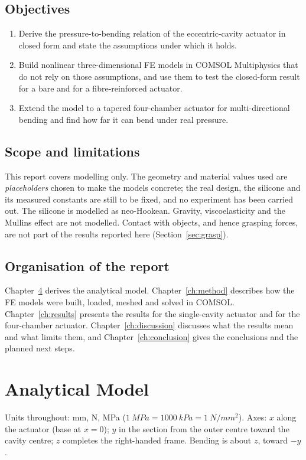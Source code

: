 \documentclass[12pt,a4paper,oneside]{report}
\numberwithin{equation}{chapter}
\numberwithin{figure}{chapter}
\numberwithin{table}{chapter}
\begin{document}
\section{Objectives}
\begin{enumerate}
\item Derive the pressure-to-bending relation of the eccentric-cavity actuator in closed form and state the
assumptions under which it holds.
\item Build nonlinear three-dimensional FE models in COMSOL Multiphysics that do not rely on those
assumptions, and use them to test the closed-form result for a bare and for a fibre-reinforced actuator.
\item Extend the model to a tapered four-chamber actuator for multi-directional bending and find how far
it can bend under real pressure.
\end{enumerate}

\section{Scope and limitations}
This report covers modelling only. The geometry and material values used are \emph{placeholders} chosen to
make the models concrete; the real design, the silicone and its measured constants are still to be fixed,
and no experiment has been carried out. The silicone is modelled as neo-Hookean. Gravity, viscoelasticity
and the Mullins effect are not modelled. Contact with objects, and hence grasping forces, are not part of
the results reported here (Section~\ref{sec:grasp}).

\section{Organisation of the report}
Chapter~\ref{ch:theory} derives the analytical model. Chapter~\ref{ch:method} describes how the FE models were
built, loaded, meshed and solved in COMSOL. Chapter~\ref{ch:results} presents the results for the
single-cavity actuator and for the four-chamber actuator. Chapter~\ref{ch:discussion} discusses what the
results mean and what limits them, and Chapter~\ref{ch:conclusion} gives the conclusions and the planned
next steps.

\chapter{Analytical Model}\label{ch:theory}
Units throughout: \si{mm}, \si{N}, \si{MPa} ($\SI{1}{MPa}=\SI{1000}{kPa}=\SI{1}{N/mm^2}$).
Axes: $x$ along the actuator (base at $x=0$); $y$ in the section from the outer centre toward the cavity
centre; $z$ completes the right-handed frame. Bending is about $z$, toward $-y$.
\end{document}

